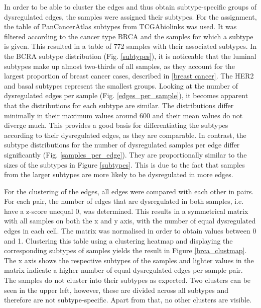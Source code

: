 \documentclass[pdftex,12pt,a4paper]{report}
\begin{document}
In order to be able to cluster the edges and thus obtain subtype-specific groups of dysregulated edges, the samples were assigned their subtypes. For the assignment, the table of PanCancerAtlas subtypes from TCGAbiolinks\cite{tcgabiolinks} was used. It was filtered according to the cancer type BRCA and the samples for which a subtype is given. This resulted in a table of 772 samples with their associated subtypes. In the BCRA subtype distribution (Fig. \ref{subtypes}), it is noticeable that the luminal subtypes make up almost two-thirds of all samples, as they account for the largest proportion of breast cancer cases, described in \ref{breast cancer}. The HER2 and basal subtypes represent the smallest groups. 
Looking at the number of dysregulated edges per sample (Fig. \ref{edges_per_sample}), it becomes apparent that the distributions for each subtype are similar. The distributions differ minimally in their maximum values around 600 and their mean values do not diverge much. This provides a good basis for differentiating the subtypes according to their dysregulated edges, as they are comparable. In contrast, the subtype distributions for the number of dysregulated samples per edge differ significantly (Fig. \ref{samples_per_edge}). They are proportionally similar to the sizes of the subtypes in Figure \ref{subtypes}. This is due to the fact that samples from the larger subtypes are more likely to be dysregulated in more edges.

For the clustering of the edges, all edges were compared with each other in pairs. For each pair, the number of edges that are dysregulated in both samples, i.e. have a z-score unequal 0, was determined. This results in a symmetrical matrix with all samples on both the x and y axis, with the number of equal dysregulated edges in each cell. The matrix was normalised in order to obtain values between 0 and 1. Clustering this table using a clustering heatmap and displaying the corresponding subtypes of samples yields the result in Figure \ref{brca_clustmap}. The x axis shows the respective subtypes of the samples and lighter values in the matrix indicate a higher number of equal dysregulated edges per sample pair.
The samples do not cluster into their subtypes as expected. Two clusters can be seen in the upper left, however, these are divided across all subtypes and therefore are not subtype-specific. Apart from that, no other clusters are visible.
\end{document}
